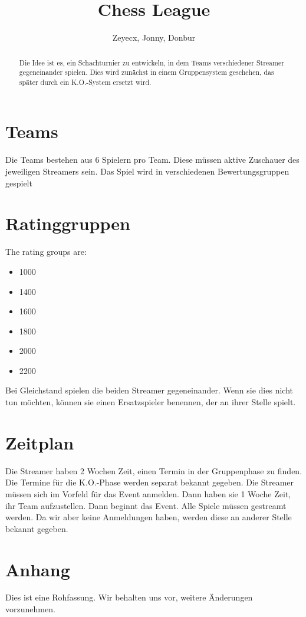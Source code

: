 \documentclass{article}
\title{Chess League}
\author{Zeyecx, Jonny, Donbur}
\begin{document}
	\maketitle
	 
\begin{abstract}
	Die Idee ist es, ein Schachturnier zu entwickeln, in dem Teams verschiedener Streamer gegeneinander spielen.
	Dies wird zunächst in einem Gruppensystem geschehen, das später durch ein K.O.-System ersetzt wird. 
\end{abstract}


\section{Teams}
Die Teams bestehen aus 6 Spielern pro Team. Diese müssen aktive Zuschauer des jeweiligen Streamers sein. 
Das Spiel wird in verschiedenen Bewertungsgruppen gespielt

\section{Ratinggruppen}

The rating groups are:
\begin{itemize}
	\item 1000
	\item 1400 
	\item 1600
	\item 1800
	\item 2000
	\item 2200
\end{itemize}
Bei Gleichstand spielen die beiden Streamer gegeneinander. Wenn sie dies nicht tun möchten, können sie einen Ersatzspieler benennen, der an ihrer Stelle spielt.

\section{Zeitplan}
Die Streamer haben 2 Wochen Zeit, einen Termin in der Gruppenphase zu finden. Die Termine für die K.O.-Phase werden separat bekannt gegeben.
Die Streamer müssen sich im Vorfeld für das Event anmelden. Dann haben sie 1 Woche Zeit, ihr Team aufzustellen.
Dann beginnt das Event.
Alle Spiele müssen gestreamt werden.
Da wir aber keine Anmeldungen haben, werden diese an anderer Stelle bekannt gegeben.

\section{Anhang}
Dies ist eine Rohfassung. Wir behalten uns vor, weitere Änderungen vorzunehmen.
	
\end{document}

